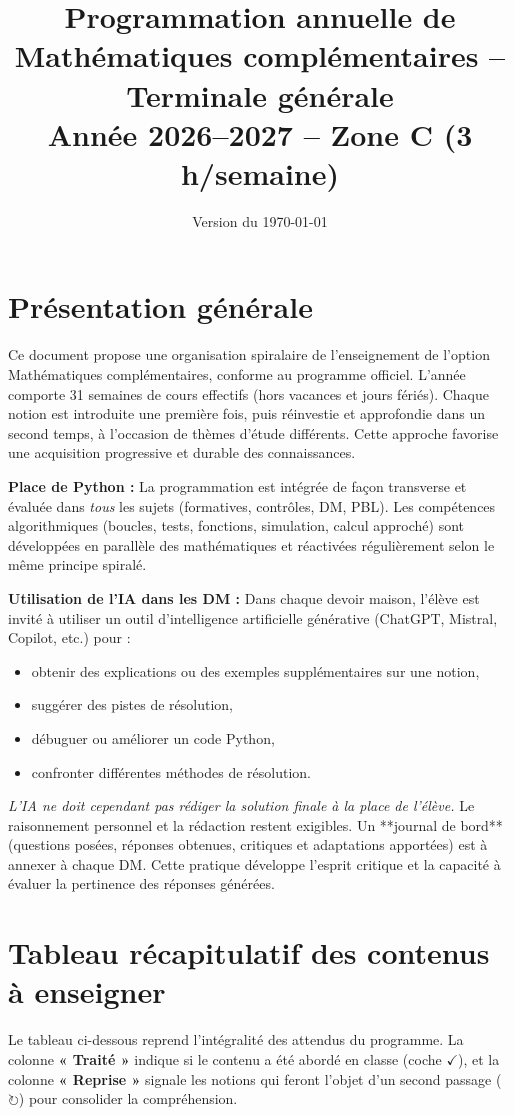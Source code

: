 \documentclass[a4paper,12pt]{article}
\title{Programmation annuelle de Mathématiques complémentaires -- Terminale générale \\
	Année 2026--2027 -- Zone C (3 h/semaine)}
\author{}
\date{Version du \today}
\newcommand{\fait}{\ensuremath{\checkmark}}
\newcommand{\revoit}{\ensuremath{\circlearrowright}}
\begin{document}
	
	\maketitle
	
	\section*{Présentation générale}
	Ce document propose une organisation spiralaire de l’enseignement de l’option Mathématiques complémentaires, conforme au programme officiel. L’année comporte 31 semaines de cours effectifs (hors vacances et jours fériés). Chaque notion est introduite une première fois, puis réinvestie et approfondie dans un second temps, à l’occasion de thèmes d’étude différents. Cette approche favorise une acquisition progressive et durable des connaissances.
	
	\medskip
	\textbf{Place de Python :} La programmation est intégrée de façon transverse et évaluée dans \emph{tous} les sujets (formatives, contrôles, DM, PBL). Les compétences algorithmiques (boucles, tests, fonctions, simulation, calcul approché) sont développées en parallèle des mathématiques et réactivées régulièrement selon le même principe spiralé.
	
	\medskip
	\textbf{Utilisation de l’IA dans les DM :} Dans chaque devoir maison, l’élève est invité à utiliser un outil d’intelligence artificielle générative (ChatGPT, Mistral, Copilot, etc.) pour :
	\begin{itemize}
		\item obtenir des explications ou des exemples supplémentaires sur une notion,
		\item suggérer des pistes de résolution,
		\item débuguer ou améliorer un code Python,
		\item confronter différentes méthodes de résolution.
	\end{itemize}
	\emph{L’IA ne doit cependant pas rédiger la solution finale à la place de l’élève.} Le raisonnement personnel et la rédaction restent exigibles. Un **journal de bord** (questions posées, réponses obtenues, critiques et adaptations apportées) est à annexer à chaque DM. Cette pratique développe l’esprit critique et la capacité à évaluer la pertinence des réponses générées.
	
	\section{Tableau récapitulatif des contenus à enseigner}
	Le tableau ci-dessous reprend l’intégralité des attendus du programme. La colonne \textbf{« Traité »} indique si le contenu a été abordé en classe (coche \fait), et la colonne \textbf{« Reprise »} signale les notions qui feront l’objet d’un second passage (\revoit) pour consolider la compréhension.
	
\end{document}
